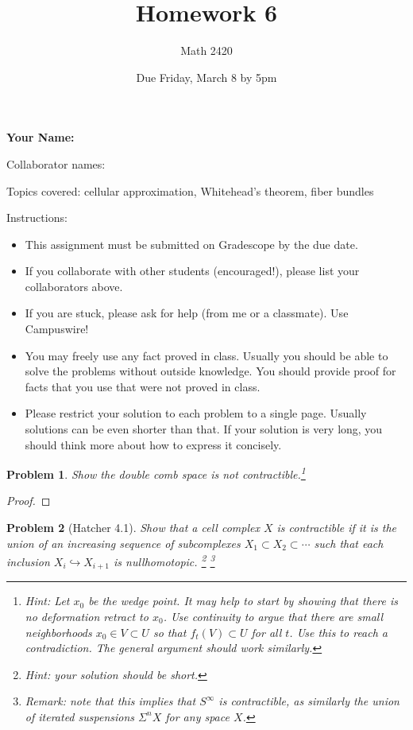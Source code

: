 \documentclass[11pt]{article}
\author{Math 2420}
\date{Due Friday, March 8 by 5pm}
\title{Homework 6}
\newtheorem{problem}{Problem}
\begin{document}
\maketitle

{\bf\Large Your Name:} 

Collaborator names: 


\vspace{.3in}
Topics covered: cellular approximation, Whitehead's theorem, fiber bundles

Instructions: 
\begin{itemize}
\item This assignment must be submitted on Gradescope by the due date. 
\item If you collaborate with other students (encouraged!), please list your collaborators above. 
\item If you are stuck, please ask for help (from me or a classmate). Use Campuswire!  
\item You may freely use any fact proved in class. Usually you should be able to solve the problems without outside knowledge. You should provide proof for facts that you use that were not proved in class. 
\item Please restrict your solution to each problem to a single page. Usually solutions can be even shorter than that. If your solution is very long, you should think more about how to express it concisely.
\end{itemize}
\pagebreak 


\pagebreak 



\begin{problem}
Show the double comb space is not contractible.\footnote{Hint: Let $x_0$ be the wedge point. It may help to start by showing that there is no deformation retract to $x_0$. Use continuity to argue that there are small neighborhoods $x_0\in V\subset U$ so that $f_t(V)\subset U$ for all $t$. Use this to reach a contradiction. The general argument should work similarly.} 
\end{problem}

\begin{proof}

\end{proof}

\pagebreak

\begin{problem}[Hatcher 4.1]
Show that a cell complex $X$ is contractible if it is the union of an increasing sequence of subcomplexes $X_1\subset X_2\subset \cdots$ such that each inclusion $X_i\hookrightarrow X_{i+1}$ is nullhomotopic. \footnote{Hint: your solution should be short.} \footnote{Remark: note that this implies that $S^\infty$ is contractible, as similarly the union of iterated suspensions $\Sigma^nX$ for any space $X$.} 
\end{problem}
\end{document}
